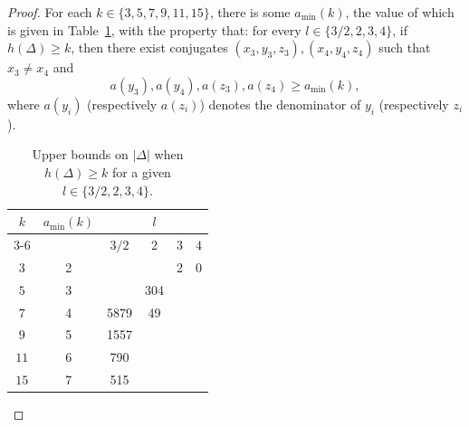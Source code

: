 \documentclass[11pt,a4paper, british]{amsart}
\theoremstyle{definition}
\theoremstyle{remark}
\numberwithin{equation}{section}
\begin{document}
\begin{proof}

For each $k \in \{3, 5, 7, 9, 11, 15\}$, there is some $a_\mathrm{min}(k)$, the value of which is given in Table~\ref{tab:bds}, with the property that: for every $l \in \{3/2, 2, 3, 4\}$, if $h(\Delta) \geq k$, then there exist conjugates $(x_3, y_3, z_3), (x_4, y_4, z_4)$ such that $x_3 \neq x_4$ and
\[ a(y_3), a(y_4), a(z_3), a(z_4) \geq a_\mathrm{min}(k),\]
where $a(y_i)$ (respectively $a(z_i)$) denotes the denominator of $y_i$ (respectively $z_i$).


\begin{table}[ht]
	\centering
	\begin{tabular}{|c |c|c|c|c|c|}
		\hline
		\multirow{2}{*}{$k$} & \multirow{2}{*}{$a_\mathrm{min}(k)$} & \multicolumn{4}{c|}{$l$} \\
		\cline{3-6}
		& &	$3/2$ & $2$ & $3$ & $4$\\
		\hline
		$3$ & 2 & & & \cellcolor[gray]{0.9} 2 & \cellcolor[gray]{0.9} 0\\
		$5$ & 3 & & 304 & &\\
		$7$ & 4 & 5879 & \cellcolor[gray]{0.9} 49 & &\\
		$9$ & 5 & 1557 &  & &\\
		$11$ & 6 & 790 & & &\\
		$15$ & 7 & \cellcolor[gray]{0.9} 515 & & &\\
		\hline
	\end{tabular}
	\caption{Upper bounds on $\lvert \Delta \rvert$ when $h(\Delta) \geq k$ for a given $l \in \{3/2, 2, 3, 4\}$.}\label{tab:bds}
\end{table}







\end{proof}
\end{document}
